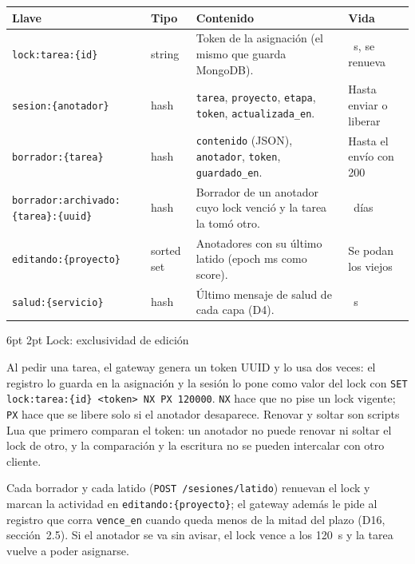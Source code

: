 \documentclass[10pt,letterpaper]{article}
\makeatletter
\renewcommand\subsection{\@startsection{subsection}{2}{\z@}%
  {6pt \@plus 1pt}{2pt}%
  {\normalfont\normalsize\bfseries\color{acc}}}
\makeatother
\begin{document}
\begin{center}\footnotesize
\begin{tabular}{@{}>{\raggedright}p{}>{\raggedright}p{}>{\raggedright}p{}>{\raggedright\arraybackslash}p{}@{}}
\toprule
Llave & Tipo & Contenido & Vida \\
\midrule
\texttt{lock:tarea:\{id\}} & string & Token de la asignación (el mismo que guarda MongoDB). & 120~s, se renueva \\
\texttt{sesion:\{anotador\}} & hash & \texttt{tarea}, \texttt{proyecto}, \texttt{etapa}, \texttt{token}, \texttt{actualizada\_en}. & Hasta enviar o liberar \\
\texttt{borrador:\{tarea\}} & hash & \texttt{contenido} (JSON), \texttt{anotador}, \texttt{token}, \texttt{guardado\_en}. & Hasta el envío con 200 \\
\texttt{borrador:archivado:}\allowbreak\texttt{\{tarea\}:\{uuid\}} & hash & Borrador de un anotador cuyo lock venció y la tarea la tomó otro. & 7~días \\
\texttt{editando:\{proyecto\}} & sorted set & Anotadores con su último latido (epoch ms como score). & Se podan los viejos \\
\texttt{salud:\{servicio\}} & hash & Último mensaje de salud de cada capa (D4). & 15~s \\
\bottomrule
\end{tabular}
\end{center}

\subsection{Lock: exclusividad de edición}

Al pedir una tarea, el gateway genera un token UUID y lo usa dos veces: el registro lo guarda en la
asignación y la sesión lo pone como valor del lock con \texttt{SET lock:tarea:\{id\} <token> NX PX 120000}.
\texttt{NX} hace que no pise un lock vigente; \texttt{PX} hace que se libere solo si el anotador
desaparece. Renovar y soltar son scripts Lua que primero comparan el token: un anotador no puede renovar
ni soltar el lock de otro, y la comparación y la escritura no se pueden intercalar con otro cliente.

Cada borrador y cada latido (\texttt{POST /sesiones/latido}) renuevan el lock y marcan la actividad en
\texttt{editando:\{proyecto\}}; el gateway además le pide al registro que corra \texttt{vence\_en} cuando
queda menos de la mitad del plazo (D16, sección~2.5). Si el anotador se va sin avisar, el lock vence a los
120~s y la tarea vuelve a poder asignarse.
\end{document}
